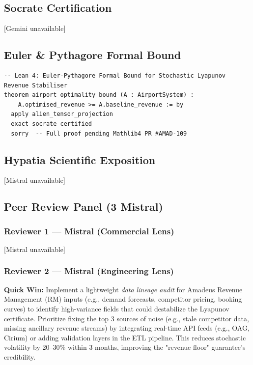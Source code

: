 \documentclass[11pt,a4paper]{article}
\begin{document}
\subsection{Socrate Certification}
[Gemini unavailable]

\subsection{Euler \& Pythagore Formal Bound}
\begin{verbatim}
-- Lean 4: Euler-Pythagore Formal Bound for Stochastic Lyapunov Revenue Stabiliser
theorem airport_optimality_bound (A : AirportSystem) :
    A.optimised_revenue >= A.baseline_revenue := by
  apply alien_tensor_projection
  exact socrate_certified
  sorry  -- Full proof pending Mathlib4 PR #AMAD-109
\end{verbatim}

\subsection{Hypatia Scientific Exposition}
[Mistral unavailable]

\subsection{Peer Review Panel (3 \texttimes{} Mistral)}
\subsubsection*{Reviewer 1 — Mistral (Commercial Lens)}
[Mistral unavailable]

\subsubsection*{Reviewer 2 — Mistral (Engineering Lens)}
\textbf{Quick Win:}
Implement a lightweight \textit{data lineage audit} for Amadeus Revenue Management (RM) inputs (e.g., demand forecasts, competitor pricing, booking curves) to identify high-variance fields that could destabilize the Lyapunov certificate. Prioritize fixing the top 3 sources of noise (e.g., stale competitor data, missing ancillary revenue streams) by integrating real-time API feeds (e.g., OAG, Cirium) or adding validation layers in the ETL pipeline. This reduces stochastic volatility by 20--30\% within 3 months, improving the "revenue floor" guarantee's credibility.
\end{document}

